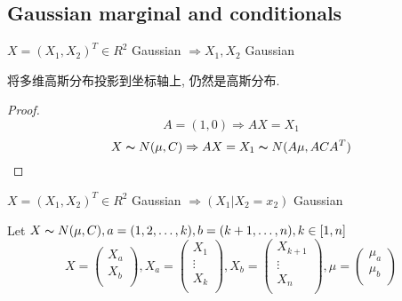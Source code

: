 \documentclass{article}
\begin{document}
\subsection{Gaussian marginal and conditionals}
\begin{theorem}
$X = (X_1, X_2)^T \in R^2$ Gaussian $\Rightarrow X_1, X_2$ Gaussian
\end{theorem}
将多维高斯分布投影到坐标轴上, 仍然是高斯分布.
\begin{proof}
$$A = (1, 0) \Rightarrow AX = X_1$$
$$X \thicksim{N}(\mu, C) \Rightarrow AX = X_1 \thicksim{N}(A\mu, ACA^T)$$
\end{proof}

\begin{theorem}
$X = (X_1, X_2)^T \in R^2$ Gaussian $\Rightarrow (X_1 | X_2 = x_2)$ Gaussian
\end{theorem}

\bigskip
Let $X \thicksim{N}(\mu, C), a = (1,2,\ldots, k), b = (k+1, \ldots, n), k \in [1,n]$\\
$$
X =
\begin{pmatrix}
    X_a \\
    X_b \\
\end{pmatrix}
,
X_a =
\begin{pmatrix}
    X_1 \\
    \vdots \\
    X_k \\
\end{pmatrix}
,
X_b =
\begin{pmatrix}
  X_{k+1} \\
  \vdots \\
  X_n \\
\end{pmatrix}
,
\mu =
\begin{pmatrix}
  \mu_a \\
  \mu_b \\
\end{pmatrix}
$$
\end{document}
